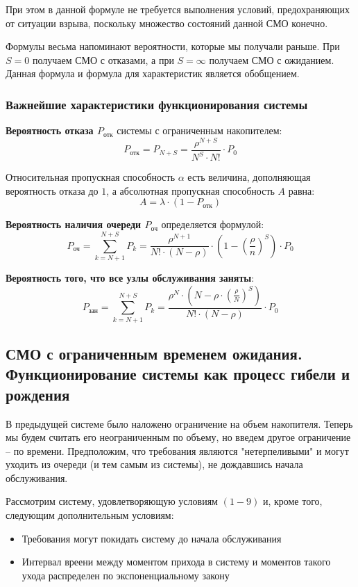 \documentclass[aps,%
12pt,%
final,%
oneside,
onecolumn,%
musixtex, %
superscriptaddress,%
centertags]{article} %
\theoremstyle{plain}
\theoremstyle{definition}
\theoremstyle{remark}
\begin{document}
При этом в данной формуле не требуется выполнения условий, предохраняющих от ситуации взрыва, поскольку множество состояний данной СМО конечно.

Формулы весьма напоминают вероятности, которые мы получали раньше. При $S=0$ получаем СМО с отказами, а при $S = \infty$ получаем СМО с ожиданием. Данная формула и формула для характеристик является обобщением.
\subsubsection{Важнейшие характеристики функционирования системы}

\textbf{Вероятность отказа $P_{\text{отк}}$} системы с ограниченным накопителем:
$$P_{\text{отк}} =  P_{N+S} = \frac{\rho^{N+S}}{N^S \cdot N!} \cdot P_0$$

Относительная пропускная способность $\alpha$ есть величина, дополняющая вероятность отказа до $1$, а абсолютная пропускная способность $A$ равна:
$$A = \lambda \cdot (1-P_{\text{отк}})$$

\textbf{Вероятность наличия очереди $P_{\text{оч}}$} определяется формулой:
$$ P_{\text{оч}} = \sum\limits_{k=N+1}^{N+S} P_k = \frac{\rho^{N+1}}{N! \cdot (N-\rho)}\cdot \left(1-\left(\frac{\rho}{n}\right)^S\right) \cdot P_0$$

\textbf{Вероятность того, что все узлы обслуживания заняты}:
$$P_{\text{зан}} = \sum\limits_{k=N+1}^{N+S} P_k =  \frac{\rho^{N}\cdot \left(N - \rho \cdot \left(\frac{\rho}{N}\right)^S\right)}{N! \cdot (N-\rho)} \cdot P_0$$

\newpage
\subsection{СМО с ограниченным временем ожидания. Функционирование системы как процесс гибели и рождения}

В предыдущей системе было наложено ограничение на объем
накопителя. Теперь мы будем считать его неограниченным по объему, но
введем другое ограничение – по времени. Предположим, что требования
являются "нетерпеливыми" и могут уходить из очереди (и тем самым из
системы), не дождавшись начала обслуживания.

Рассмотрим систему, удовлетворяющую условиям $(1-9)$ и, кроме того, следующим дополнительным условиям:
\begin{itemize}
	\item Требования могут покидать систему до начала обслуживания
	\item Интервал вреени между моментом прихода в систему и моментов такого ухода распределен по экспоненциальному закону
\end{itemize}
\end{document}
